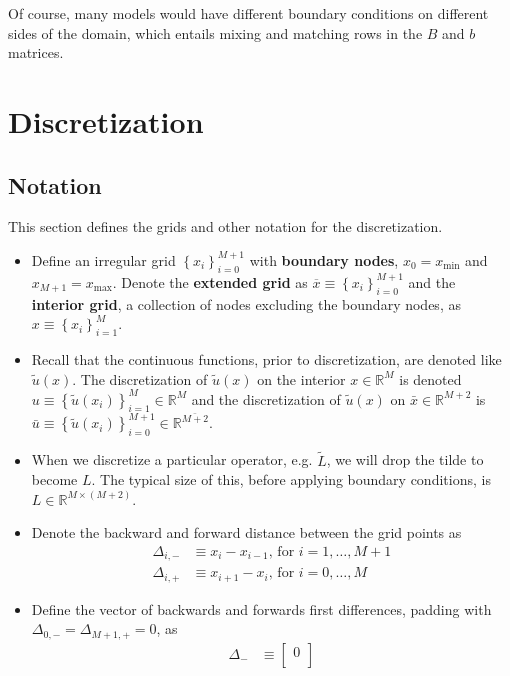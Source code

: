 \documentclass[11pt]{article}
\newcommand{\set}[1]{\ensuremath{\left\{{#1}\right\}}}
\newcommand{\R}{\ensuremath{\mathbb{R}}}
\theoremstyle{definition}
\begin{document}
Of course, many models would have different boundary conditions on different sides of the domain, which entails mixing and matching rows in the $B$ and $b$ matrices.


\section{Discretization}
\subsection{Notation}
This section defines the grids and other notation for the discretization.
\begin{itemize}
	\item Define an irregular grid $\set{x_i}_{i=0}^{M+1}$ with \textbf{boundary nodes}, $x_0 = {x_{\min}}$ and $x_{M+1} = {x_{\max}}$. Denote the \textbf{extended grid} as $\overline{x} \equiv \set{x_i}_{i=0}^{M+1}$ and the \textbf{interior grid}, a collection of nodes excluding the boundary nodes, as $x \equiv \set{x_i}_{i=1}^{M} $.
	\item Recall that the continuous functions, prior to discretization, are denoted like $\tilde{u}(x)$.  The discretization of $\tilde{u}(x)$ on the interior $x\in \R^M$ is denoted $u \equiv \set{\tilde{u}(x_i)}_{i=1}^M\in \R^M$ and the discretization of $\tilde{u}(x)$ on $\bar{x} \in \R^{M+2}$ is $\bar{u} \equiv \set{\tilde{u}(x_i)}_{i=0}^{M+1} \in \R^{\bar{M+2}}$.
	\item When we discretize a particular operator, e.g. $\tilde{L}$, we will drop the tilde to become $L$.  The typical size of this, before applying boundary conditions, is $L \in \R^{M \times (M+2)}$.
	\item Denote the backward and forward distance between the grid points as
	\begin{align}
	\Delta_{i,-} &\equiv x_i - x_{i-1},\, \text{for } i = 1,\ldots, M+1\\
	\Delta_{i,+} &\equiv x_{i+1} - x_i,\, \text{for } i = 0,\ldots, M
	\end{align}
	\item Define the vector of backwards and forwards first differences, padding with $\Delta_{0,-} = \Delta_{M+1,+} = 0$, as
	\begin{align}
	\Delta_{-} &\equiv \begin{bmatrix} 0 \\

\end{bmatrix}
\end{align}
\end{itemize}
\end{document}
